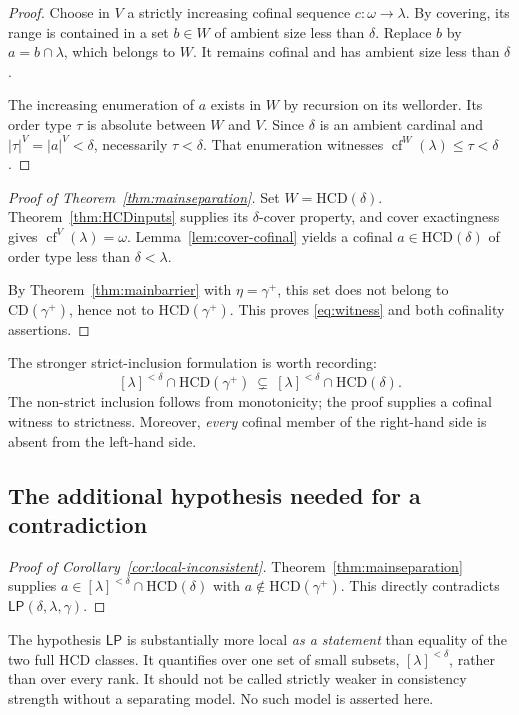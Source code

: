 \documentclass[11pt,letterpaper]{article}
\theoremstyle{definition}
\newcommand{\cf}{\operatorname{cf}}
\newcommand{\CD}{\mathrm{CD}}
\newcommand{\HCD}{\mathrm{HCD}}
\newcommand{\LP}{\mathsf{LP}}
\numberwithin{equation}{section}
\begin{document}
\begin{proof}
Choose in $V$ a strictly increasing cofinal sequence $c:\omega\to\lambda$. By covering, its range is contained in a set $b\in W$ of ambient size less than $\delta$. Replace $b$ by $a=b\cap\lambda$, which belongs to $W$. It remains cofinal and has ambient size less than $\delta$.

The increasing enumeration of $a$ exists in $W$ by recursion on its wellorder. Its order type $\tau$ is absolute between $W$ and $V$. Since $\delta$ is an ambient cardinal and $|\tau|^V=|a|^V<\delta$, necessarily $\tau<\delta$. That enumeration witnesses $\cf^W(\lambda)\leq\tau<\delta$.
\end{proof}

\begin{proof}[Proof of Theorem~\ref{thm:mainseparation}]
Set $W=\HCD(\delta)$. Theorem~\ref{thm:HCDinputs} supplies its $\delta$-cover property, and cover exactingness gives $\cf^V(\lambda)=\omega$. Lemma~\ref{lem:cover-cofinal} yields a cofinal $a\in\HCD(\delta)$ of order type less than $\delta<\lambda$.

By Theorem~\ref{thm:mainbarrier} with $\eta=\gamma^+$, this set does not belong to $\CD(\gamma^+)$, hence not to $\HCD(\gamma^+)$. This proves \eqref{eq:witness} and both cofinality assertions.
\end{proof}

The stronger strict-inclusion formulation is worth recording:
\begin{equation}\label{eq:strictlocal}
 [\lambda]^{<\delta}\cap\HCD(\gamma^+)
   \ \subsetneq\
 [\lambda]^{<\delta}\cap\HCD(\delta).
\end{equation}
The non-strict inclusion follows from monotonicity; the proof supplies a cofinal witness to strictness. Moreover, \emph{every} cofinal member of the right-hand side is absent from the left-hand side.

\subsection{The additional hypothesis needed for a contradiction}

\begin{proof}[Proof of Corollary~\ref{cor:local-inconsistent}]
Theorem~\ref{thm:mainseparation} supplies $a\in[\lambda]^{<\delta}\cap\HCD(\delta)$ with $a\notin\HCD(\gamma^+)$. This directly contradicts $\LP(\delta,\lambda,\gamma)$.
\end{proof}

The hypothesis $\LP$ is substantially more local \emph{as a statement} than equality of the two full HCD classes. It quantifies over one set of small subsets, $[\lambda]^{<\delta}$, rather than over every rank. It should not be called strictly weaker in consistency strength without a separating model. No such model is asserted here.
\end{document}
